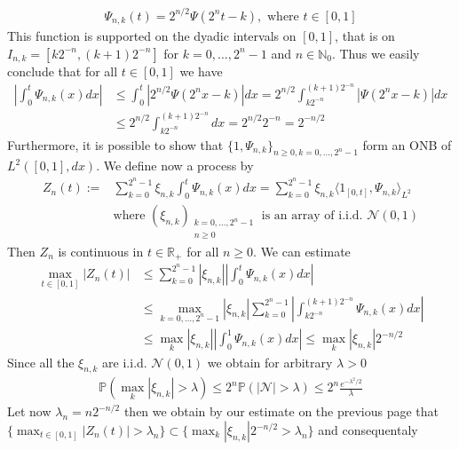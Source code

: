 \documentclass[11pt,a4paper, final]{article}
\theoremstyle{definition}
\begin{document}
\begin{align*}
\Psi_{n,k}(t) = 2^{n/2} \Psi(2^n t-k), \text{ where } t \in [0,1]
\end{align*}
This function is supported on the dyadic intervals on $[0,1]$, that is on \\ $I_{n,k} = [k 2^{-n}, (k+1)2^{-n}]$ for $k=0, \dots , 2^n-1$ and $n \in \mathbb{N}_0$. Thus we easily conclude that for all $t \in [0,1]$ we have 
\begin{align*}
\left| \int_0^t \Psi_{n,k}(x) dx \right| &\leq \int_0^t | 2^{n/2} \Psi(2^n x-k ) |dx = 2^{n/2} \int_{k2^{-n}}^{(k+1)2^{-n}} |\Psi(2^n x-k)|dx
 \\ &\leq 2^{n/2} \int_{k2^{-n}}^{(k+1)2^{-n}} dx = 2^{n/2} 2^{-n} = 2^{-n/2}
\end{align*}
Furthermore, it is possible to show that $\lbrace 1, \Psi_{n,k} \rbrace_{n \geq 0, k =0, \dots , 2^n-1}$ form an ONB of $L^2([0,1], dx)$. We define now a process by
\begin{align*}
Z_n(t) :=& \sum_{k=0}^{2^n-1} \xi_{n,k} \int_0^t \Psi_{n,k}(x) dx = \sum_{k=0}^{2^n-1} \xi_{n,k} \langle 1_{[0,t]}, \Psi_{n,k} \rangle_{L^2} \\ 
& \text{where } (\xi_{n,k})_{ \substack{ k = 0, \dots , 2^n-1 \\ n \geq 0 }} \text{ is an array of i.i.d. } \mathcal{N}(0,1)
\end{align*}
Then $Z_n$ is continuous in $t \in \mathbb{R}_+$ for all $n \geq 0$. We can estimate 
\begin{align*}
\max_{t \in [0,1]} |Z_n(t)|  &\leq \sum_{k=0}^{2^n-1} | \xi_{n,k} | \left| \int_0^t \Psi_{n,k}(x) dx \right| \\ & \leq \max_{k =0, \dots , 2^n-1} |\xi_{n,k}| \sum_{k=0}^{2^n-1} \left| \int_{k2^{-n}}^{(k+1)2^{-n}} \Psi_{n,k}(x) dx \right|  \\
&\leq \max_k | \xi_{n,k}|  \left| \int_0^1 \Psi_{n,k}(x) dx \right| \leq  \max_{k} | \xi_{n,k} | 2^{-n/2}
\end{align*}
\newpage
Since all the $\xi_{n,k}$ are i.i.d. $\mathcal{N}(0,1)$ we obtain for arbitrary $\lambda >0$ 
\begin{align*}
\mathbb{P}( \max_k | \xi_{n,k}| > \lambda ) \leq 2^n \mathbb{P}( | \mathcal{N}| > \lambda) \leq 2^n \frac{e^{- \lambda^2/2}}{\lambda}
\end{align*}
Let now $\lambda_n = n 2^{-n/2}$ then we obtain by our estimate on the previous page that $\lbrace \max_{t \in [0,1]} | Z_n(t) | > \lambda_n \rbrace \subset \lbrace \max_k | \xi_{n,k} | 2^{-n/2}  > \lambda_n \rbrace$ and consequentaly 
\end{document}
